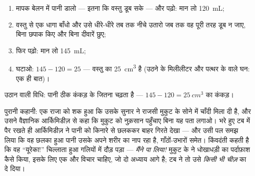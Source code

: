 \begin{method}\label{met:g6:mass-and-volume:rise}
\begin{enumerate}
  \item मापक बेलन में पानी डालो --- इतना कि वस्तु डूब सके --- और
         पढ़ो: मान लो \qty{120}{mL};
  \item वस्तु से एक धागा बाँधो और उसे धीरे-धीरे तब तक नीचे उतारो जब
        तक वह पूरी तरह डूब न जाए, बिना छपाक किए और बिना दीवारें
        छुए;
  \item फिर पढ़ो: मान लो \qty{145}{mL};
  \item घटाओ: $145 - 120 = 25$ --- वस्तु का  \qty{25}{cm^3} है
        (उठने के मिलीलीटर और पत्थर के  वाले घन: एक ही
        बात)।
\end{enumerate}
\end{method}

\begin{omfigure}

{\small उठान वाली विधि: पानी ठीक कंकड़ के  जितना चढ़ता है ---
$145 - 120 = \qty{25}{cm^3}$ का कंकड़।}
\end{omfigure}

\begin{example}[नहाने के टब में मुकुट]\label{ex:g6:mass-and-volume:archimedes}
पुरानी कहानी: एक राजा को शक हुआ कि उसके सुनार ने राजसी मुकुट के सोने
में चाँदी मिला दी है, और उसने वैज्ञानिक आर्किमिडीज़ से कहा कि मुकुट को
नुक़सान पहुँचाए बिना यह पता लगाओ। भरे हुए टब में पैर रखते ही आर्किमिडीज़
ने पानी को किनारे से छलककर बाहर गिरते देखा --- और उसी पल समझ लिया कि
वह छलका हुआ पानी उसके अपने शरीर का  नाप रहा है, गाँठों-उभारों
समेत। किंवदंती कहती है कि वह ``यूरेका!'' चिल्लाता हुआ गलियों में दौड़
पड़ा --- \emph{मैंने पा लिया!} मुकुट के  ने धोखाधड़ी का पर्दाफ़ाश
कैसे किया, इसके लिए एक और विचार चाहिए, जो दो अध्याय आगे है; टब ने तो
उसे \emph{किसी भी चीज़} का  दे दिया।
\end{example}

